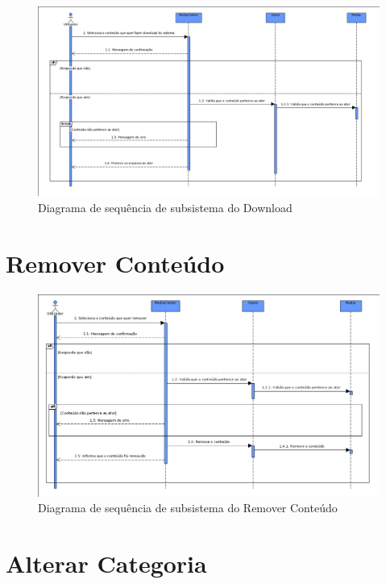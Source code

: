 \documentclass[a4paper]{report}
\begin{document}
\begin{figure}[H]
	\centering 
    \includegraphics[width=\textwidth]{images/downloadSub.png}  
    \caption{Diagrama de sequência de subsistema do Download}
\end{figure}

\section{Remover Conteúdo}

\begin{figure}[H]
	\centering 
    \includegraphics[width=\textwidth]{images/remconteudoSub.png}  
    \caption{Diagrama de sequência de subsistema do Remover Conteúdo}
\end{figure}

\section{Alterar Categoria}
\end{document}
